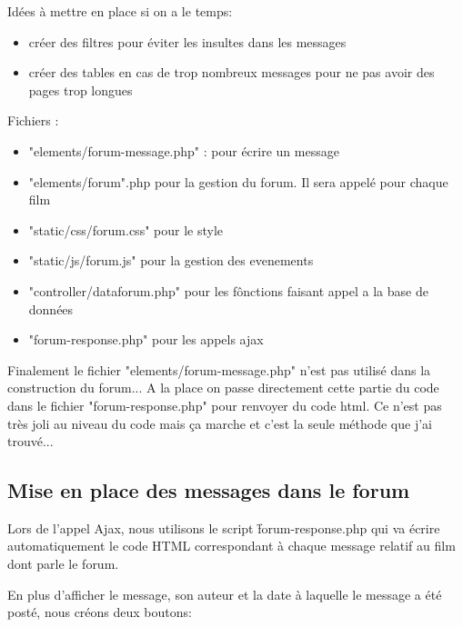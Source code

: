                 \bigskip
                Idées à mettre en place si on a le temps:
                \begin{itemize}
                    \item créer des filtres pour éviter les insultes dans les messages
                    \item créer des tables en cas de trop nombreux messages pour ne pas avoir des pages trop longues 
                \end{itemize}

                \bigskip
                Fichiers :
                \begin{itemize}
                    \item "elements/forum-message.php" : pour écrire un message
                    \item "elements/forum".php pour la gestion du forum. Il sera appelé pour chaque film
                    \item "static/css/forum.css" pour le style
                    \item "static/js/forum.js" pour la gestion des evenements
                    \item "controller/dataforum.php" pour les fônctions faisant appel a la base de données
                    \item "forum-response.php" pour les appels ajax
                \end{itemize}

                Finalement le fichier "elements/forum-message.php" n'est pas utilisé dans la construction du forum... A la place on passe directement cette partie du code dans le fichier "forum-response.php" pour renvoyer du code html. Ce n'est pas très joli au niveau du code mais ça marche et c'est la seule méthode que j'ai trouvé...



                \subsection{Mise en place des messages dans le forum}


                    Lors de l'appel Ajax, nous utilisons le script \f{forum-response.php} qui va écrire automatiquement le code HTML correspondant à chaque message relatif au film dont parle le forum. 

                    En plus d'afficher le message, son auteur et la date à laquelle le message a été posté, nous créons deux boutons:

